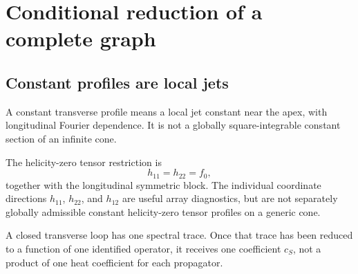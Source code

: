 \documentclass[11pt,a4paper]{article}
\theoremstyle{plain}
\theoremstyle{definition}
\theoremstyle{remark}
\numberwithin{equation}{section}
\begin{document}
\section{Conditional reduction of a complete graph}
\label{sec:reduction}

\subsection{Constant profiles are local jets}

A constant transverse profile means a local jet constant near
the apex, with longitudinal Fourier dependence. It is not a
globally square-integrable constant section of an infinite cone.

The helicity-zero tensor restriction is
\[
 h_{11}=h_{22}=f_0,
\]
together with the longitudinal symmetric block.
The individual coordinate directions \(h_{11}\), \(h_{22}\),
and \(h_{12}\) are useful array diagnostics, but are not
separately globally admissible constant helicity-zero tensor
profiles on a generic cone.

A closed transverse loop has one spectral trace. Once that trace
has been reduced to a function of one identified operator, it
receives one coefficient \(c_S\), not a product of one heat
coefficient for each propagator.
\end{document}
